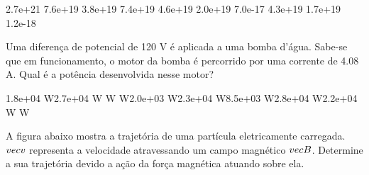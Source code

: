 \documentclass[12pt, addpoints]{exam}
\begin{document}
\begin{questions}
\begin{multicols*}{2}
\begin{oneparchoices}
\choice 2.7e+21 \choice 7.6e+19 \choice 3.8e+19 \choice 7.4e+19 \choice 4.6e+19 \choice 2.0e+19 \choice 7.0e-17 \choice 4.3e+19 \choice 1.7e+19 \choice 1.2e-18 
\end{oneparchoices}\question Uma diferença de potencial de 120 V é aplicada a uma bomba d’água. Sabe-se que em funcionamento, o motor da bomba é percorrido por uma corrente de    4.08 A. Qual é a potência desenvolvida nesse motor?

\begin{oneparchoices}
\choice 1.8e+04 W\choice 2.7e+04 W W W\choice 2.0e+03 W\choice 2.3e+04 W\choice 8.5e+03 W\choice 2.8e+04 W\choice 2.2e+04 W W
\end{oneparchoices}\question A ﬁgura abaixo mostra a trajetória de uma partícula eletricamente carregada. $\\vec{{v}}$ representa a velocidade atravessando um campo magnético $\\vec{{B}}$. Determine a sua trajetória devido a ação da força magnética atuando sobre ela.
        
        \begin{center}
            \begin{minipage}[c]{0.5\linewidth}
            \end{minipage}
        \end{center}


\end{multicols*}
\end{questions}
\end{document}

